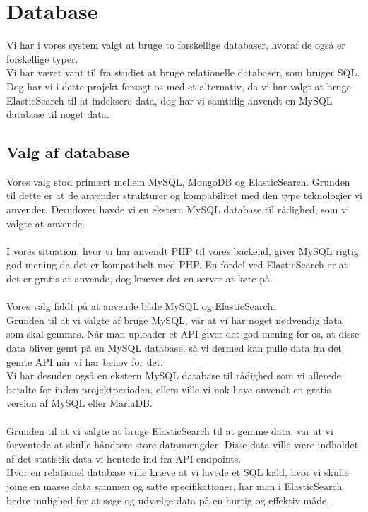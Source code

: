 \section{Database}
Vi har i vores system valgt at bruge to forskellige databaser, hvoraf de også er forskellige typer.
\\
Vi har været vant til fra studiet at bruge relationelle databaser, som bruger SQL. Dog har vi i dette projekt 
forsøgt os med et alternativ, da vi har valgt at bruge ElasticSearch til at indeksere data, dog har vi samtidig anvendt en MySQL database til noget data.
\subsection{Valg af database}
Vores valg stod primært mellem MySQL, MongoDB og ElasticSearch. Grunden til dette er at de anvender strukturer og
kompabilitet med den type teknologier vi anvender. Derudover havde vi en ekstern MySQL database til rådighed, som vi valgte at anvende.
\\\\
I vores situation, hvor vi har anvendt PHP til vores backend, giver MySQL rigtig god mening da det er kompatibelt med PHP.
En fordel ved ElasticSearch er at det er gratis at anvende, dog kræver det en server at køre på.
\\\\
Vores valg faldt på at anvende både MySQL og ElasticSearch.
\\
Grunden til at vi valgte af bruge MySQL, var at vi har noget nødvendig data som skal gemmes. Når man uploader et API giver det god mening
for os, at disse data bliver gemt på en MySQL database, så vi dermed kan pulle data fra det gemte API når vi har behov for det.\\
Vi har desuden også en ekstern MySQL database til rådighed som vi allerede betalte for inden projektperioden, ellers ville vi nok have anvendt en gratis version
af MySQL eller MariaDB.
\\\\
Grunden til at vi valgte at bruge ElasticSearch til at gemme data, var at vi forventede at skulle håndtere store datamængder.
Disse data ville være indholdet af det statistik data vi hentede ind fra API endpoints.
\\
Hvor en relationel database ville kræve at vi lavede et SQL kald, hvor vi skulle joine en masse data sammen og satte specifikationer, har man i ElasticSearch
bedre mulighed for at søge og udvælge data på en hurtig og effektiv måde.
\\
